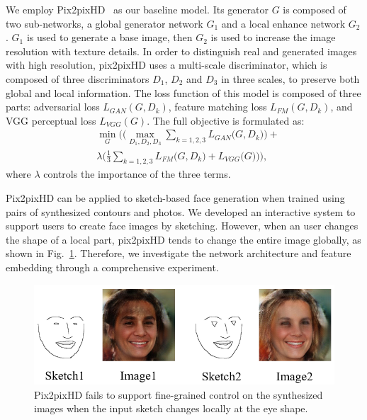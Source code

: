 \documentclass{article}
\begin{document}
We employ Pix2pixHD~\cite{pix2pixhd} as our baseline model.
Its generator $G$ is composed of two sub-networks, a global generator network $G_1$ and a local enhance network $G_2$. 
$G_1$ is used to generate a base image, then $G_2$ is used to increase the image resolution with texture details. 
In order to distinguish real and generated images with high resolution, pix2pixHD uses a multi-scale discriminator, which is composed of three discriminators $D_1$, $D_2$ and $D_3$ in three scales, to preserve both global and local information. 
The loss function of this model is composed of three parts: adversarial loss $L_{GAN}(G,D_k)$, feature matching loss $L_{FM}(G,D_k)$, and VGG perceptual loss $L_{VGG}(G)$. The full objective is formulated as:
\begin{equation}
\begin{split}
&\underset{G}{\min}\Bigg(\bigg(\underset{D_1,D_2,D_3}{\max} \sum_{k=1,2,3}{L_{GAN}\big(G,D_k\big)}\bigg)+  \\
&\lambda \bigg(\frac{1}{3}\sum_{k=1,2,3}{L_{FM}\big(G,D_k\big)}+L_{VGG}{\big(G\big)}\bigg)\Bigg),
\end{split}
\end{equation}
\noindent
where $\lambda$ controls the importance of the three terms.


Pix2pixHD can be applied to sketch-based face generation when trained using pairs of synthesized contours and photos. 
We developed an interactive system to support users to create face images by sketching. 
However, when an user changes the shape of a local part, pix2pixHD tends to change the entire image globally, as shown in Fig.~\ref{fig:problem-in}.
Therefore, we investigate the network architecture and feature embedding through a comprehensive experiment.

\begin{figure}
	\centering
	\includegraphics[width=\columnwidth]{figures/prob-in-pix2pixHD.png}
	\caption{Pix2pixHD fails to support fine-grained control on the synthesized images when the input sketch changes locally at the eye shape.}
	\label{fig:problem-in}
\end{figure}
\end{document}

